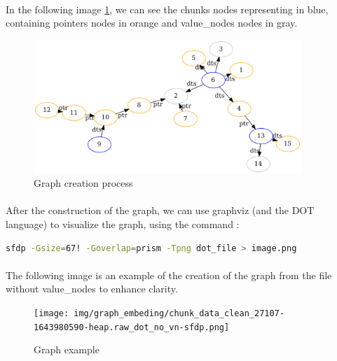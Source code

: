         \paragraph{}In the following image \ref{fig:graph_embedding:graph_creation_process}, we can see the \glspl{chunk} nodes representing in blue, containing \glspl{pointer} nodes in orange and \glspl{value_node} nodes in gray. 

        \begin{figure}[H]
            \centering
            \includegraphics[width=0.9\textwidth]{img/graph_embeding/graph_explain.png}
            \caption{Graph creation process}
            \label{fig:graph_embedding:graph_creation_process}
        \end{figure}

        \paragraph{}After the construction of the graph, we can use graphviz (and the DOT language)\cite{farin_graphviz_2004} to visualize the graph, using the command :
        \begin{lstlisting}[language=bash]
            sfdp -Gsize=67! -Goverlap=prism -Tpng dot_file > image.png
        \end{lstlisting}

        \paragraph{}The following image is an example of the creation of the graph from the file  without \glspl{value_node} to enhance clarity.
        \begin{figure}[H]
            \centering
            \texttt{[image: img/graph\_embeding/chunk\_data\_clean\_27107-1643980590-heap.raw\_dot\_no\_vn-sfdp.png]}
            \caption{Graph example}
            \label{fig:graph_embedding:graph_example}
        \end{figure}

